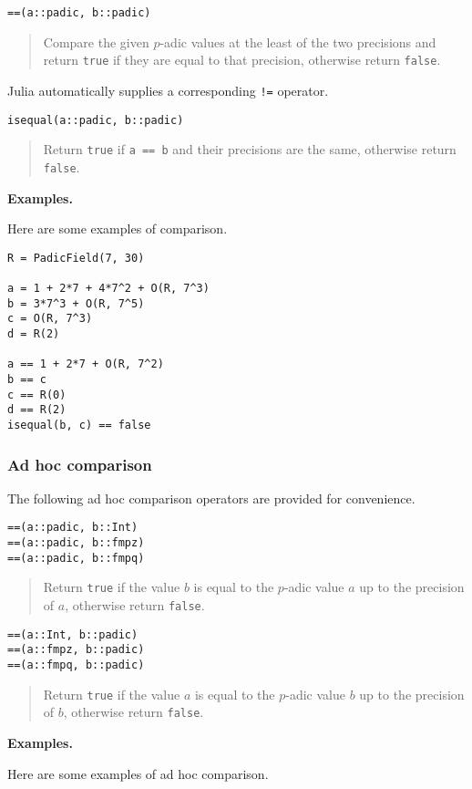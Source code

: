 \documentclass[a4paper,10pt]{article}
\newcommand{\code}{\lstinline}
\newcommand{\desc}[1]{\vspace{-3mm}\begin{quote}#1\end{quote}}
\begin{document}
{{\begin{lstlisting}
==(a::padic, b::padic)
\end{lstlisting}

\desc{Compare the given $p$-adic values at the least of the two precisions and
return \code{true} if they are equal to that precision, otherwise return
\code{false}.}

Julia automatically supplies a corresponding \code{!=} operator.

\begin{lstlisting}
isequal(a::padic, b::padic)
\end{lstlisting}

\desc{Return \code{true} if \code{a == b} and their precisions are the same,
otherwise return \code{false}.}

\textbf{Examples.}

Here are some examples of comparison.

\begin{lstlisting}
R = PadicField(7, 30)

a = 1 + 2*7 + 4*7^2 + O(R, 7^3)
b = 3*7^3 + O(R, 7^5)
c = O(R, 7^3)
d = R(2)

a == 1 + 2*7 + O(R, 7^2)
b == c
c == R(0)
d == R(2)
isequal(b, c) == false
\end{lstlisting}

\subsubsection{Ad hoc comparison}

The following ad hoc comparison operators are provided for convenience. 

\begin{lstlisting}
==(a::padic, b::Int)
==(a::padic, b::fmpz)
==(a::padic, b::fmpq)
\end{lstlisting}

\desc{Return \code{true} if the value $b$ is equal to the $p$-adic 
value $a$ up to the precision of $a$, otherwise return \code{false}.}

\begin{lstlisting}
==(a::Int, b::padic)
==(a::fmpz, b::padic)
==(a::fmpq, b::padic)
\end{lstlisting}

\desc{Return \code{true} if the value $a$ is equal to the $p$-adic 
value $b$ up to the precision of $b$, otherwise return \code{false}.}

\textbf{Examples.}

Here are some examples of ad hoc comparison.

}}
\end{document}
